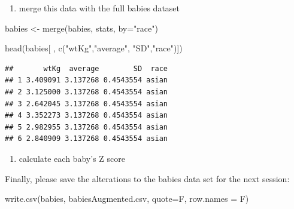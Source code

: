 \documentclass[
]{book}
\newenvironment{Shaded}{\begin{snugshade}}{\end{snugshade}}
\newcommand{\AttributeTok}[1]{\textcolor[rgb]{0.77,0.63,0.00}{#1}}
\newcommand{\FunctionTok}[1]{\textcolor[rgb]{0.00,0.00,0.00}{#1}}
\newcommand{\NormalTok}[1]{#1}
\newcommand{\OtherTok}[1]{\textcolor[rgb]{0.56,0.35,0.01}{#1}}
\newcommand{\SpecialCharTok}[1]{\textcolor[rgb]{0.00,0.00,0.00}{#1}}
\newcommand{\StringTok}[1]{\textcolor[rgb]{0.31,0.60,0.02}{#1}}
\providecommand{\tightlist}{%
  \setlength{\itemsep}{0pt}\setlength{\parskip}{0pt}}
\begin{document}
\begin{enumerate}
\def\labelenumi{\arabic{enumi}.}
\setcounter{enumi}{1}
\tightlist
\item
  merge this data with the full babies dataset
\end{enumerate}

\begin{Shaded}
\begin{Highlighting}[]
\NormalTok{babies }\OtherTok{\textless{}{-}} \FunctionTok{merge}\NormalTok{(babies, }
\NormalTok{                stats, }
                \AttributeTok{by=}\StringTok{"race"}\NormalTok{)}

\FunctionTok{head}\NormalTok{(babies[ , }\FunctionTok{c}\NormalTok{(}\StringTok{"wtKg"}\NormalTok{,}\StringTok{"average"}\NormalTok{, }\StringTok{"SD"}\NormalTok{,}\StringTok{"race"}\NormalTok{)])}
\end{Highlighting}
\end{Shaded}

\begin{verbatim}
##       wtKg  average        SD  race
## 1 3.409091 3.137268 0.4543554 asian
## 2 3.125000 3.137268 0.4543554 asian
## 3 2.642045 3.137268 0.4543554 asian
## 4 3.352273 3.137268 0.4543554 asian
## 5 2.982955 3.137268 0.4543554 asian
## 6 2.840909 3.137268 0.4543554 asian
\end{verbatim}

\begin{enumerate}
\def\labelenumi{\arabic{enumi}.}
\setcounter{enumi}{2}
\tightlist
\item
  calculate each baby's Z score
\end{enumerate}

\begin{Shaded}
\end{Shaded}

Finally, please save the alterations to the babies data set for the next session:

\begin{Shaded}
\begin{Highlighting}[]
\FunctionTok{write.csv}\NormalTok{(babies, }\StringTok{\textquotesingle{}babiesAugmented.csv\textquotesingle{}}\NormalTok{, }\AttributeTok{quote=}\NormalTok{F, }\AttributeTok{row.names =}\NormalTok{ F)}
\end{Highlighting}
\end{Shaded}
\end{document}
